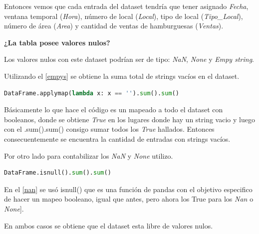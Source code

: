 \documentclass[11pt,spanish]{article}
\begin{document}
Entonces vemos que cada entrada del dataset tendría que tener asignado \textit{Fecha}, ventana temporal (\textit{Hora}), número de local (\textit{Local}), tipo de local (\textit{Tipo\_Local}), número de área (\textit{Area}) y cantidad de ventas de hamburguesas (\textit{Ventas}).

\vspace{3mm}

\textbf{¿La tabla posee valores nulos?}

\vspace{3mm}

Los valores nulos con este dataset podrían ser de tipo: \textit{NaN}, \textit{None} y \textit{Empy string}.

Utilizando el \cref{empys} se obtiene la suma total de strings vacíos en el dataset. 
\vspace{2mm}
\begin{lstlisting}[language=Python, caption= Código para encontrar la cantidad de stings vacios, label = empys]
DataFrame.applymap(lambda x: x == '').sum().sum()

\end{lstlisting}
\vspace{2mm}

Básicamente lo que hace el código es un mapeado \cite{applymap} a todo el dataset con booleanos, donde se obtiene \textit{True} en los lugares donde hay un string vacio y luego con el .sum().sum() consigo sumar todos los \textit{True} hallados. Entonces consecuentemente se encuentra la cantidad de entradas con strings vacíos.

Por otro lado para contabilizar los \textit{NaN} y \textit{None} utilizo. 

\vspace{2mm}
\begin{lstlisting}[language=Python, caption= Codigo para encontrar la cantidad de \textit{NaN} y \textit{None}. , label=nan]
DataFrame.isnull().sum().sum()

\end{lstlisting}
\vspace{2mm}

En el \cref{nan} se usó isnull() \cite{isnull} que es una función de pandas con el objetivo especifico de hacer un mapeo booleano, igual que antes, pero ahora los True para los \textit{Nan} o \textit{None}].

\vspace{3mm}
En ambos casos se obtiene que el dataset esta libre de valores nulos.
\end{document}
